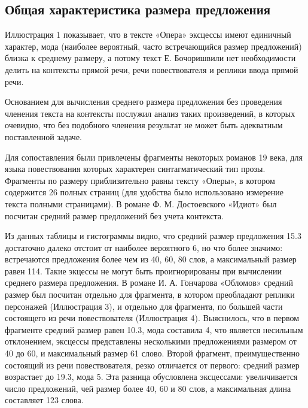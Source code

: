 \documentclass{kursa4}
\begin{document}
      \subsection{Общая характеристика размера предложения}


        

        {Иллюстрация 1 показывает, что в тексте «Опера» эксцессы имеют единичный характер, мода (наиболее вероятный, часто встречающийся размер предложений) близка к среднему размеру, а потому текст Е. Бочоришвили нет необходимости делить на контексты прямой речи, речи повествователя и реплики ввода прямой речи. }

        {Основанием для вычисления среднего размера предложения без проведения членения текста на контексты послужил анализ таких произведений, в которых очевидно, что без подобного членения результат не может быть адекватным поставленной задаче. }

        Для сопоставления были привлечены фрагменты некоторых романов 19 века, для языка повествования которых характерен синтагматический тип прозы. Фрагменты по размеру приблизительно равны тексту «Оперы», в котором содержится 26 полных страниц (для удобства было использовано измерение текста полными страницами). В романе Ф. М. Достоевского «Идиот» был посчитан средний размер предложений без учета контекста. 

        

        Из данных таблицы и гистограммы видно, что средний размер предложения 15.3 достаточно далеко отстоит от наиболее вероятного 6, но что более значимо: встречаются предложения более чем из 40, 60, 80 слов, а максимальный размер равен 114. Такие экцессы не могут быть проигнорированы при вычислении среднего размера предложения. В романе И. А. Гончарова «Обломов» средний размер был посчитан отдельно для фрагмента, в котором преобладают реплики персонажей (Иллюстрация 3), и отдельно для фрагмента, по большей части состоящего из речи повествователя (Иллюстрация 4). Выяснилось, что в первом фрагменте средний размер равен 10.3, мода составила 4, что является несильным отклонением, эксцессы представлены несколькими предложениями размером от 40 до 60, и максимальный размер 61 слово. Второй фрагмент, преимущественно состоящий из речи повествователя, резко отличается от первого: средний размер возрастает до 19.3, мода 5. Эта разница обусловлена эксцессами: увеличивается число предложений, чей размер более 40, 60 и 80 слов, а максимальная длина составляет 123 слова. 
\end{document}
